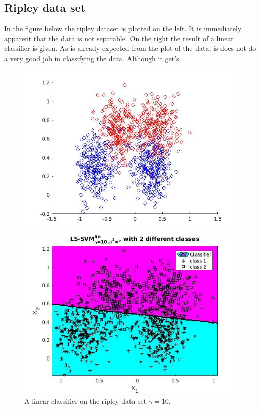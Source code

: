 \documentclass[•]{article}
\begin{document}
\subsection{Ripley data set}
In the figure below the ripley dataset is plotted on the left. It is immediately apparent that the data is not separable. On the right the result of a linear classifier is given. As is already expected from the plot of the data, is does not do a very good job in classifying the data. Although it get's
\begin{figure}[h!]
\centering
\begin{minipage}{.45\textwidth}
\includegraphics[width=.8\textwidth]{ripleyplot.jpg}
\end{minipage}
\begin{minipage}{.45\textwidth}
\includegraphics[width=.8\textwidth]{ripleylin.jpg}
\end{minipage}
\caption{A linear classifier on the ripley data set $\gamma = 10$.}
\end{figure}
\end{document}
